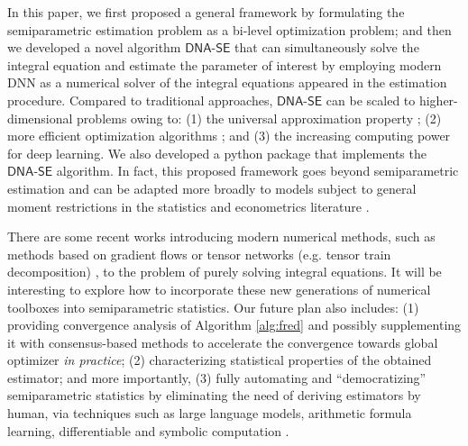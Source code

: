 \documentclass{article}
\def\dnase{{\mathsf{DNA\mbox{-}SE}}}
\theoremstyle{plain}
\theoremstyle{definition}
\theoremstyle{remark}
\begin{document}
In this paper, we first proposed a general framework by formulating the semiparametric estimation problem as a bi-level optimization problem; and then we developed a novel algorithm $\dnase$ that can simultaneously solve the integral equation and estimate the parameter of interest by employing modern DNN as a numerical solver of the integral equations appeared in the estimation procedure. Compared to traditional approaches, $\dnase$ can be scaled to higher-dimensional problems owing to: (1) the universal approximation property \citep{siegel2020approximation}; (2) more efficient optimization algorithms \citep{kingma2015adam}; and  (3) the increasing computing power for deep learning. We also developed a python package that implements the $\dnase$ algorithm. In fact, this proposed framework goes beyond semiparametric estimation and can be adapted more broadly to models subject to general moment restrictions in the statistics and econometrics literature \citep{ai2003efficient, chen2018overidentification}.

There are some recent works introducing modern numerical methods, such as methods based on gradient flows \citep{crucinio2022solving} or tensor networks (e.g. tensor train decomposition) \citep{cichocki2016tensor, cichocki2017tensor, corona2017tensor, chen2023learninggan}, to the problem of purely solving integral equations. It will be interesting to explore how to incorporate these new generations of numerical toolboxes into semiparametric statistics. %
Our future plan also includes: (1) providing convergence analysis of Algorithm \ref{alg:fred} and possibly supplementing it with consensus-based methods \citep{carrillo2021consensus} to accelerate the convergence towards global optimizer \textit{in practice}; (2) characterizing statistical properties of the obtained estimator; and more importantly, (3) fully automating and ``democratizing'' semiparametric statistics by eliminating the need of deriving estimators by human, via techniques such as large language models, arithmetic formula learning, differentiable and symbolic computation \citep{frangakis2015deductive, carone2019toward, polu2020generative, garg2020learning, trinh2024solving, luedtke2024simplifying}. 

\end{document}
